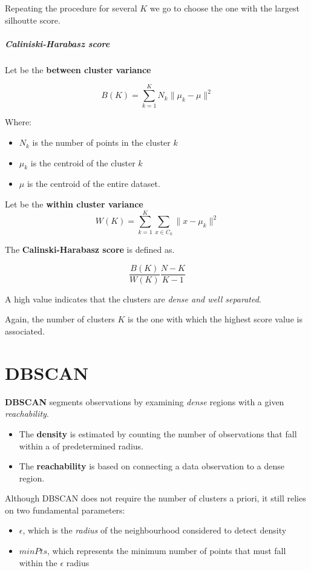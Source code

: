 Repeating the procedure for several $K$ we go to choose the one with the largest silhoutte score.
\subparagraph*{Caliniski-Harabasz score}

Let be the \textbf{between cluster variance}

\[
    B(K)=\sum_{k=1}^KN_k\|\mu_k-\mu\|^2
\]

Where:
\begin{itemize}
    \item $N_k$ is the number of points in the cluster $k$
    \item $\mu_k$ is the centroid of the cluster $k$
    \item $\mu$ is the centroid of the entire dataset.
\end{itemize}

Let be the \textbf{within cluster variance}
\[
    W(K)=\sum_{k=1}^K\sum_{x\in C_k}\|x-\mu_k\|^2
\]

The \textbf{Calinski-Harabasz score} is defined as.

\[
    \frac{B(K)}{W(K)}\frac{N-K}{K-1}
\]

A high value indicates that the clusters are \textit{dense and well separated}.

Again, the number of clusters $K$ is the one with which the highest score value is associated.

\section{DBSCAN}
\textbf{DBSCAN} segments observations by examining \textit{dense} regions with a given \textit{reachability}.

\begin{itemize}
    \item The \textbf{density} is estimated by counting the number of observations that fall within a of predetermined radius.
    \item The \textbf{reachability} is based on connecting a data observation to a dense region. 
\end{itemize}

Although DBSCAN does not require the number of clusters a priori, it still relies on two fundamental parameters:
\begin{itemize}
    \item $\epsilon$, which is the \textit{radius} of the neighbourhood considered to detect density
    \item $minPts$, which represents the minimum number of points that must fall within the $\epsilon$ radius
\end{itemize}

